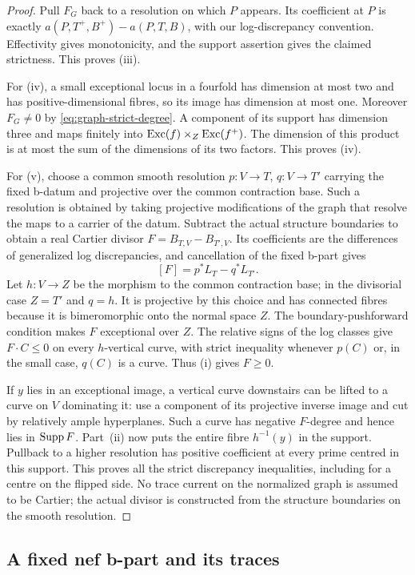 \begin{proof}
Pull $F_G$ back to a resolution on which $P$ appears.  Its coefficient
at $P$ is exactly
$a(P,T^+,B^+)-a(P,T,B)$, with our log-discrepancy convention.
Effectivity gives monotonicity, and the support assertion gives the
claimed strictness.  This proves (iii).

For (iv), a small exceptional locus in a fourfold has dimension at
most two and has positive-dimensional fibres, so its image has
dimension at most one.  Moreover $F_G\ne0$ by
\eqref{eq:graph-strict-degree}.  A component of its support has
dimension three and maps finitely into
$\operatorname{Exc}(f)\times_Z\operatorname{Exc}(f^+)$.  The dimension of this product is at most
the sum of the dimensions of its two factors.  This proves (iv).

For (v), choose a common smooth resolution $p:V\to T$,
$q:V\to T'$ carrying the fixed b-datum and projective over the
common contraction base.  Such a resolution is obtained by taking
projective modifications of the graph that resolve the maps to a
carrier of the datum.  Subtract the actual
structure boundaries to obtain a real Cartier divisor
$F=B_{T,V}-B_{T',V}$.  Its coefficients are the differences of
generalized log discrepancies, and cancellation of the fixed
b-part gives
\[
 [F]=p^*L_T-q^*L_{T'}.
\]
Let $h:V\to Z$ be the morphism to the common contraction base;
in the divisorial case $Z=T'$ and $q=h$.  It is projective by this
choice and has connected fibres because it is bimeromorphic onto
the normal space $Z$.  The boundary-pushforward
condition makes $F$ exceptional over $Z$.  The relative signs of
the log classes give $F\cdot C\leq0$ on every $h$-vertical curve,
with strict inequality whenever $p(C)$ or, in the small case,
$q(C)$ is a curve.  Thus (i) gives $F\geq0$.

If $y$ lies in an exceptional image, a vertical curve downstairs
can be lifted to a curve on $V$ dominating it: use a component of
its projective inverse image and cut by relatively ample
hyperplanes.  Such a curve has negative $F$-degree and hence lies
in $\operatorname{Supp} F$.  Part~(ii) now puts the entire fibre $h^{-1}(y)$ in
the support.  Pullback to a higher resolution has positive
coefficient at every prime centred in this support.  This proves
all the strict discrepancy inequalities, including for a centre
on the flipped side.  No trace current on the normalized graph
is assumed to be Cartier; the actual divisor is constructed from
the structure boundaries on the smooth resolution.
\end{proof}

\subsection{A fixed nef b-part and its traces}


